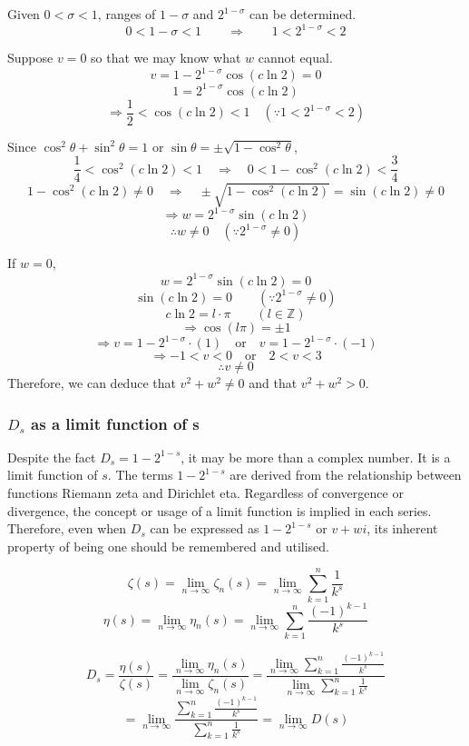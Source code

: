 \documentclass{amsart}
\begin{document}
	Given $ 0 < \sigma < 1 $, ranges of $1-\sigma$ and $2^{1-\sigma}$ can be determined.
	\[ 0 < 1-\sigma < 1 \qquad \Rightarrow \qquad 1 < 2^{1-\sigma} < 2 \]
	
	Suppose $v=0$ so that we may know what $w$ cannot equal.
	\[ v = 1 - 2^{1-\sigma}\cos(c \ln 2) = 0 \]
	\[ 1 = 2^{1-\sigma}\cos(c \ln 2) \]
	\[ \Rightarrow \frac{1}{2} < \cos(c \ln 2) < 1 \quad (\because 1 < 2^{1-\sigma} < 2) \]
	
	Since $\cos^2\theta + \sin^2\theta = 1$ or $ \sin\theta = \pm \sqrt{1-\cos^2{\theta}} $,
	\[ \frac{1}{4} < \cos^2(c \ln 2) < 1 \quad \Rightarrow \quad 0 < 1 - \cos^2(c \ln 2) < \frac{3}{4} \]
	\[ 1 - \cos^2(c \ln 2) \neq 0 \quad \Rightarrow \quad \pm\sqrt{1 - \cos^2(c \ln 2)} = \sin(c \ln 2) \neq 0 \]
	\[ \Rightarrow w = 2^{1-\sigma}\sin(c \ln 2) \]
	\[ \therefore w \neq 0 \quad (\because 2^{1-\sigma} \neq 0) \]
	
	If $w=0$,
	\[ w = 2^{1-\sigma}\sin(c \ln 2) = 0 \]
	\[ \sin(c \ln 2) = 0 \qquad (\because 2^{1-\sigma} \neq 0) \]
	\[ c \ln 2 = l\cdot\pi \qquad (l \in \mathbb{Z}) \]
	\[ \Rightarrow \cos(l\pi) = \pm 1 \]
	\[ \Rightarrow v = 1 - 2^{1-\sigma} \cdot (1) \quad \text{or} \quad v = 1 - 2^{1-\sigma} \cdot (-1) \]	
	\[ \Rightarrow -1 < v < 0 \quad \text{or} \quad 2 < v < 3  \]	
	\[ \therefore v \neq 0 \]
	\[\]
	Therefore, we can deduce that $v^2 + w^2 \neq 0$ and that $v^2 + w^2 > 0$.
	\[\]
	
	\subsubsection{$D_s$ as a limit function of s}
	Despite the fact $D_{s} = 1-2^{1-s}$, it may be more than a complex number. It is a limit function of $s$. The terms $1-2^{1-s}$ are derived from the relationship between functions Riemann zeta and Dirichlet eta. Regardless of convergence or divergence, the concept or usage of a limit function is implied in each series. Therefore, even when $D_s$ can be expressed as $1-2^{1-s}$ or $v+wi$, its inherent property of being one should be remembered and utilised.
	
	\[ \zeta(s) = \lim_{n \to \infty} \zeta_{n}(s) = \lim_{n \to \infty} \sum\limits_{k=1}^{n}\frac{1}{k^s}  \]
	\[ \eta(s) = \lim_{n \to \infty} \eta_{n}(s) = \lim_{n \to \infty} \sum\limits_{k=1}^{n}\frac{(-1)^{k-1}}{k^s}  \]
	
	\[ D_s = \frac{\eta(s)}{\zeta(s)} = \frac{\lim\limits_{n \to \infty} \eta_{n}(s)}{\lim\limits_{n \to \infty} \zeta_{n}(s)} = \frac{\lim\limits_{n \to \infty} \sum\limits_{k=1}^{n}\frac{(-1)^{k-1}}{k^s}}{\lim\limits_{n \to \infty} \sum\limits_{k=1}^{n} \frac{1}{k^s}} \]
	\[= \lim\limits_{n \to \infty} \frac{\sum\limits_{k=1}^{n}\frac{(-1)^{k-1}}{k^s}}{\sum\limits_{k=1}^{n} \frac{1}{k^s}} = \lim\limits_{n \to \infty}D(s) \]
	\[\]
	
\end{document}
